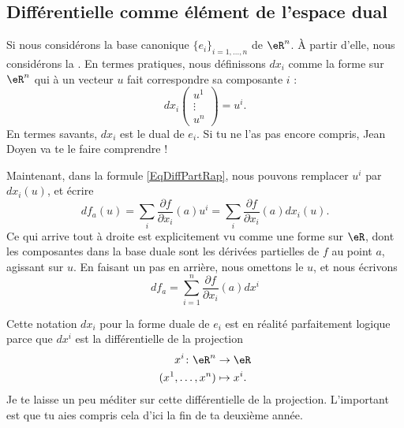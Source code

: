                     \subsection{Différentielle comme élément de l'espace dual}

Si nous considérons la base canonique $\{ e_i \}_{i=1,\ldots,n}$ de $\eR^n$. À partir d'elle, nous considérons la . En termes pratiques, nous définissons $dx_i$ comme la forme sur $\eR^n$ qui à un vecteur $u$ fait correspondre sa composante $i$ :
\begin{equation}
    dx_i\begin{pmatrix}
    u^1 \\ 
    \vdots  \\ 
    u^n 
\end{pmatrix}=u^i.
\end{equation}
En termes savants, $dx_i$ est le dual de $e_i$. Si tu ne l'as pas encore compris, Jean Doyen va te le faire comprendre !


Maintenant, dans la formule \eqref{EqDiffPartRap}, nous pouvons remplacer $u^i$ par $dx_i(u)$, et écrire
\begin{equation}
    df_a(u)=\sum_i\frac{ \partial f }{ \partial x_i }(a)u^i=\sum_i\frac{ \partial f }{ \partial x_i }(a)dx_i(u).
\end{equation}
Ce qui arrive tout à droite est explicitement vu comme une forme sur $\eR$, dont les composantes dans la base duale sont les dérivées partielles de $f$ au point $a$, agissant sur $u$. En faisant un pas en arrière, nous omettons le $u$, et nous écrivons
\begin{equation}
    df_a=\sum_{i=1}^n\frac{ \partial f }{ \partial x_i }(a)dx^i
\end{equation}

Cette notation $dx_i$ pour la forme duale de $e_i$ est en réalité parfaitement logique parce que $dx^i$ est la différentielle de la projection
\begin{equation}
    \begin{aligned}
        x^i\colon \eR^n&\to \eR \\
        (x^1,\ldots,x^n)&\mapsto x^i. 
    \end{aligned}
\end{equation}
Je te laisse un peu méditer sur cette différentielle de la projection. L'important est que tu aies compris cela d'ici la fin de ta deuxième année.


